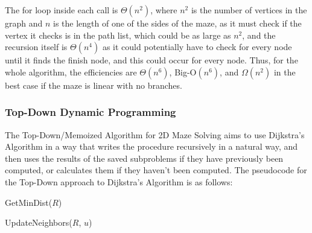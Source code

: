 \documentclass[11pt]{article}
\begin{document}
\begin{multicols}{2}
	The for loop inside each call is ${\Theta(n^2)}$, where ${n^2}$ is the number of vertices in the
	graph and ${n}$ is the length of one of the sides of the maze, as it must check if the vertex it checks is in the path list, which could be as large as ${n^2}$, and the
	recursion itself is ${\Theta(n^4)}$ as it could potentially have to check for
	every node until it finds the finish node, and this could occur for every node. Thus, for the whole algorithm, the efficiencies are
	${\Theta(n^6)}$, Big-O${(n^6)}$, and
	${\Omega(n^2)}$ in the best case if the maze is linear with no branches.

	\subsubsection{Top-Down Dynamic Programming}
	The Top-Down/Memoized Algorithm for 2D Maze Solving aims to use Dijkstra's Algorithm in a way
	that writes the procedure recursively in a natural way, and then uses the results of the saved
	subproblems if they have previously been computed, or calculates them if they haven't been
	computed.
	The pseudocode for the Top-Down approach to Dijkstra's Algorithm is as follows:

	\begin{algorithm}[H]
		\SetAlgoLined
		\SetStartEndCondition{ }{}{}%
		\AlgoDontDisplayBlockMarkers\SetAlgoNoEnd\SetAlgoNoLine%
		\caption{GetMinDist(${R}$)\label{min-dist}}
	\end{algorithm}

	\begin{algorithm}[H]
		\SetAlgoLined
		\SetStartEndCondition{ }{}{}%
		\AlgoDontDisplayBlockMarkers\SetAlgoNoEnd\SetAlgoNoLine%
		\caption{UpdateNeighbors(${R}$, ${u}$)\label{update}}
	\end{algorithm}


\end{multicols}
\end{document}
